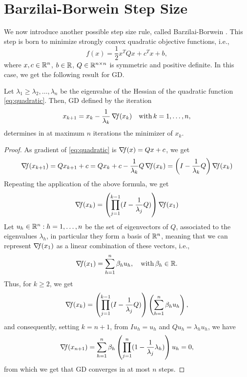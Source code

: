 \documentclass[10pt,a4paper]{article}
\begin{document}
\section{Barzilai-Borwein Step Size}
We now introduce another possible step size rule, called Barzilai-Borwein \cite{barzilai88a}. This step is born to minimize strongly convex quadratic objective functions, i.e.,
\begin{equation}\label{eq:quadratic}
	f(x) =\frac{1}{2} x^TQx + c^Tx + b,
\end{equation}
where $x,c\in\mathbb{R}^n$, $b\in \mathbb{R}$, $Q\in \mathbb{R}^{n\times n}$ is symmetric and positive definite. In this case, we get the following result for GD.
\begin{proposition}
	Let $\lambda_1\geq \lambda_2, \dots,\lambda_n$ be the eigenvalue of the Hessian of the quadratic function \eqref{eq:quadratic}. Then, GD defined by the iteration
	\begin{equation}\label{eq:eigengrad}
		x_{k+1} = x_k -\frac{1}{\lambda_k} \operatorname*{\mathit{\nabla \!f}}(x_k) \quad \mathord{\mathrm{with }}\, k=1, \dots, n,
	\end{equation}
	determines in at maximum $n$ iterations the minimizer of $x_k$. 
\end{proposition}
\begin{proof}
	As gradient of \eqref{eq:quadratic} is $\operatorname*{\mathit{\nabla \!f}}(x)=Qx+c$, we get
	\begin{equation*}
		\operatorname*{\mathit{\nabla \!f}}(x_{k+1}) = Qx_{k+1} +c = Qx_k +c -\frac{1}{\lambda_k} Q \operatorname*{\mathit{\nabla \!f}}(x_k) = \left(I -\frac{1}{\lambda_k}Q\right)\operatorname*{\mathit{\nabla \!f}}(x_k)
	\end{equation*}
Repeating the application of the above formula, we get 
\begin{equation*}
	\operatorname*{\mathit{\nabla \!f}}(x_k) = \left(\prod_{j=1}^{k-1}(I-\frac{1}{\lambda_j}Q)\right)\operatorname*{\mathit{\nabla \!f}}(x_1)
\end{equation*}
Let ${u_h \in \mathbb{R}^n: h=1, \dots, n}$ be the set of eigenvectors of $Q$, associated to the eigenvalues $\lambda_h$, in particular they form a basis of $\mathbb{R}^n$, meaning that we can represent $\operatorname*{\mathit{\nabla \!f}}(x_1)$ as a linear combination of these vectors, i.e.,  
\begin{equation*}
	\operatorname*{\mathit{\nabla \!f}}(x_1) = \sum_{h=1}^{n} \beta_h u_h,\quad\mathord{\mathrm{with }}\, \beta_h\in\mathbb{R}. 
\end{equation*}
Thus, for $k\geq 2$, we get 
\begin{equation*}
	\operatorname*{\mathit{\nabla \!f}}(x_k) = \left(\prod_{j=1}^{k-1}(I-\frac{1}{\lambda_j}Q)\right) \left(\sum_{h=1}^{n} \beta_h u_h\right),
\end{equation*}
and consequently, setting $k=n+1$, from $Iu_h = u_h$ and $Qu_h=\lambda_hu_h$, we have
\begin{equation*}
	\operatorname*{\mathit{\nabla \!f}}(x_{n+1}) = \sum_{h=1}^{n} \beta_h \left(\prod_{j=1}^{n}(1-\frac{1}{\lambda_j}\lambda_h)\right) u_h=0,
\end{equation*}
from which we get that GD converges in at most $n$ steps.
\end{proof}
\end{document}
